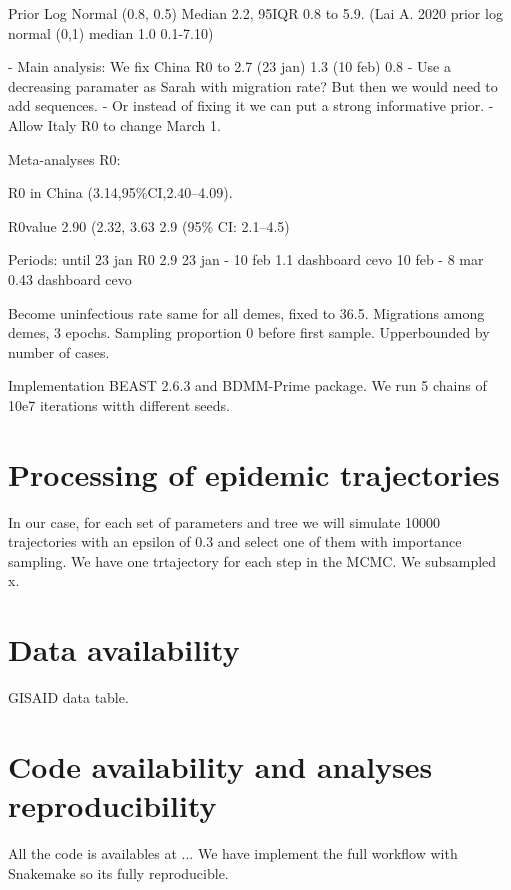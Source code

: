 Prior Log Normal (0.8, 0.5) Median 2.2, 95IQR 0.8 to 5.9.
(Lai A. 2020 prior log normal (0,1) median 1.0 0.1-7.10)

- Main analysis: We fix China R0 to 2.7 (23 jan) 1.3 (10 feb) 0.8
- Use a decreasing paramater as Sarah with migration rate? But then we would need to add sequences.
- Or instead of fixing it we can put a strong informative prior.
- Allow Italy R0 to change March 1.


Meta-analyses R0:

R0 in China (3.14,95\%CI,2.40–4.09).\cite{Billah2020}

R0value 2.90 (2.32, 3.63
 2.9 (95\% CI: 2.1–4.5)\cite{Park2020}


Periods:
until 23 jan R0 2.9 
23 jan - 10 feb 1.1 dashboard cevo
10 feb - 8 mar 0.43 dashboard cevo



Become uninfectious rate same for all demes, fixed to 36.5.
Migrations among demes, 3 epochs.
Sampling proportion 0 before first sample. Upperbounded by number of cases.

Implementation BEAST 2.6.3 and BDMM-Prime package.
We run 5 chains of 10e7 iterations witth different seeds.

\section{Processing of epidemic trajectories}
In our case, for each set of parameters and tree we will simulate 10000 trajectories with an epsilon of 0.3 and select one of them with importance sampling.
We have one trtajectory for each step in the MCMC. We subsampled x. 

\section{Data availability}
GISAID data table.

\section{Code availability and analyses reproducibility}
All the code is availables at ...
We have implement the full workflow with Snakemake so its fully reproducible.


